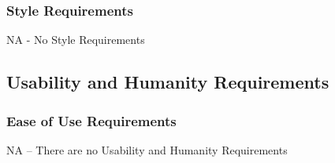 \documentclass[12pt]{article}
\newcommand{\todo}[1]{\textcolor{red}{[TODO: #1]}} \else
\newcommand{\authornote}[3]{} \newcommand{\todo}[1]{} \fi
\newcommand{\ds}[1]{\authornote{blue}{DS}{#1}} %
\newcommand{\mmp}[1]{\authornote{green}{MP}{#1}}
\newcounter{ReqNumCounter}
\newcommand{\requirement}[8]{%
\fbox{\parbox{\textwidth}{%
\parbox[t]{.333\textwidth}{\raggedright%
\textbf{Req. \#}: \refstepcounter{ReqNumCounter} \arabic{ReqNumCounter} \label{#1}}%
\parbox[t]{.333\textwidth}{\centering%
\textbf{Req. Type}: \ref{#2}}%
\parbox[t]{.333\textwidth}{\raggedleft%
\textbf{Use Case \#}: \ref{#3}}
\newline\\
\textbf{Description}: #4\\\\
\textbf{Rationale}: #5\\\\
\textbf{Fit Criterion}: #6\\\\
\textbf{Priority}: #7 \hfill \textbf{History}: #8
}}}
\begin{document}
\subsubsection{Style Requirements} 
NA - No Style Requirements
\ds{This is not a requirement for your end-product.}\mmp{commented out the CodeOrganization requirement}
\subsection{Usability and Humanity Requirements}\label{ReqType_Usabil} %

\subsubsection{Ease of Use Requirements}
NA -- There are no Usability and Humanity Requirements

\mmp{Removed this requirement since it is done automatically by the code}
\ds{Your description shouldn't include ``should be easy". 
It should be detailing \emph{what} the product is supposed to do.
Ease of use is a non-functional requirement.}\mmp{Moved to Ease of Use Requirements}
\end{document}
